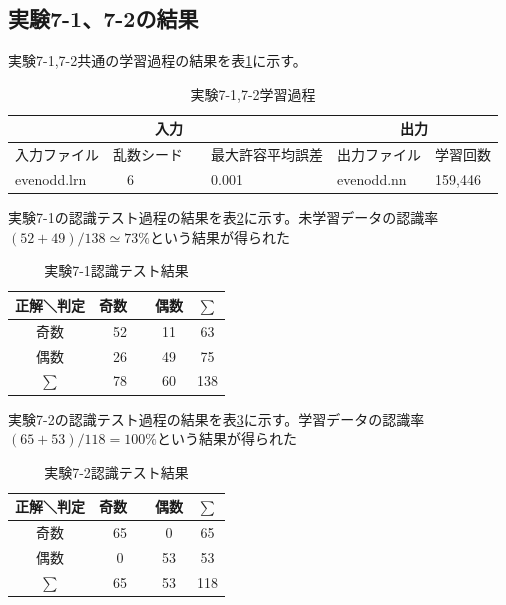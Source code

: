 \documentclass[final]{jarticle}[2012/05/15]
\begin{document}
\subsection{実験7-1、7-2の結果}
実験7-1,7-2共通の学習過程の結果を表\ref{zi_ga_7}に示す。\par
\begin{table}[h]
  \begin{center}
    \caption{実験7-1,7-2学習過程} \label{zi_ga_7}
    \begin{tabular}{|l|l|l|l|l|}\hline
      \multicolumn{3}{|c|}{入力} & \multicolumn{2}{|c|}{出力} \\ \hline
      入力ファイル & 乱数シード &　最大許容平均誤差 & 出力ファイル & 学習回数 \\ \hline
      evenodd.lrn &　6 &　0.001 & evenodd.nn & 159,446 \\ \hline
    \end{tabular}
  \end{center}
\end{table}
実験7-1の認識テスト過程の結果を表\ref{zi_ke_7_1}に示す。未学習データの認識率$(52+49)/138\simeq73\%$という結果が得られた\par
\begin{table}[h]
  \begin{center}
    \caption{実験7-1認識テスト結果} \label{zi_ke_7_1}
    \begin{tabular}{|c|c|c|c|}\hline
      正解＼判定 & 奇数 &　偶数 & $\sum$ \\ \hline
      奇数 &　52 &　11 & 63 \\ \hline
      偶数 &　26 &　49 & 75 \\ \hline
      $\sum$ &　78 &　60 & 138 \\ \hline
    \end{tabular}
  \end{center}
\end{table}
実験7-2の認識テスト過程の結果を表\ref{zi_ke_7_2}に示す。学習データの認識率$(65+53)/118=100\%$という結果が得られた\par
\begin{table}[h]
  \begin{center}
    \caption{実験7-2認識テスト結果} \label{zi_ke_7_2}
    \begin{tabular}{|c|c|c|c|}\hline
      正解＼判定 & 奇数 &　偶数 & $\sum$ \\ \hline
      奇数 &　65 &　0 & 65 \\ \hline
      偶数 &　0 &　53 & 53 \\ \hline
      $\sum$ &　65 &　53 & 118 \\ \hline
    \end{tabular}
  \end{center}
\end{table}
\end{document}
